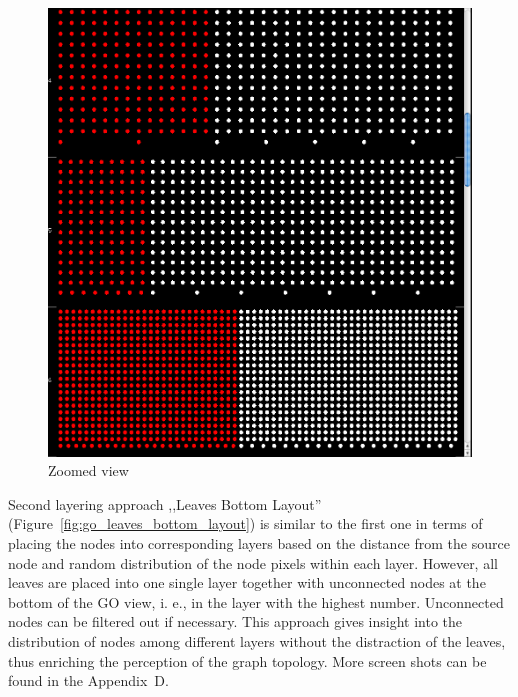 \begin{figure}[h!]
\centering
\includegraphics[scale=0.3]{pictures/go_levels_layout_zoomed.png}
\caption{Zoomed view}
\label{fig:go_levels_layout_zoomed}
\end{figure}

Second layering approach ,,Leaves Bottom Layout'' (Figure~\ref{fig:go_leaves_bottom_layout}) is similar to the first one in terms of placing the nodes into corresponding layers based on the distance from the source node and random distribution of the node pixels within each layer. However, all leaves are placed into one single layer together with unconnected nodes at the bottom of the GO view, i. e., in the layer with the highest number. Unconnected nodes can be filtered out if necessary. This approach gives insight into the distribution of nodes among different layers without the distraction of the leaves, thus enriching the perception of the graph topology. More screen shots can be found in the Appendix~D.

